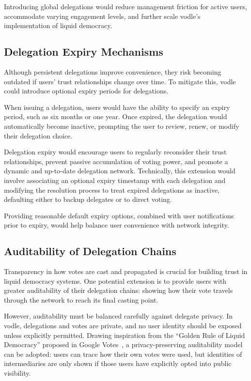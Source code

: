 Introducing global delegations would reduce management friction for active users, accommodate varying engagement levels, and further scale vodle's implementation of liquid democracy.

\subsection{Delegation Expiry Mechanisms}

Although persistent delegations improve convenience, they risk becoming outdated if users' trust relationships change over time. To mitigate this, vodle could introduce optional expiry periods for delegations.

When issuing a delegation, users would have the ability to specify an expiry period, such as six months or one year. Once expired, the delegation would automatically become inactive, prompting the user to review, renew, or modify their delegation choice.

Delegation expiry would encourage users to regularly reconsider their trust relationships, prevent passive accumulation of voting power, and promote a dynamic and up-to-date delegation network. Technically, this extension would involve associating an optional expiry timestamp with each delegation and modifying the resolution process to treat expired delegations as inactive, defaulting either to backup delegates or to direct voting.

Providing reasonable default expiry options, combined with user notifications prior to expiry, would help balance user convenience with network integrity.

\subsection{Auditability of Delegation Chains}

Transparency in how votes are cast and propagated is crucial for building trust in liquid democracy systems. One potential extension is to provide users with greater auditability of their delegation chains: showing how their vote travels through the network to reach its final casting point.

However, auditability must be balanced carefully against delegate privacy. In vodle, delegations and votes are private, and no user identity should be exposed unless explicitly permitted. Drawing inspiration from the ``Golden Rule of Liquid Democracy'' proposed in Google Votes~\citep{hardt_google_2015}, a privacy-preserving auditability model can be adopted:  
users can trace how their own votes were used, but identities of intermediaries are only shown if those users have explicitly opted into public visibility.

